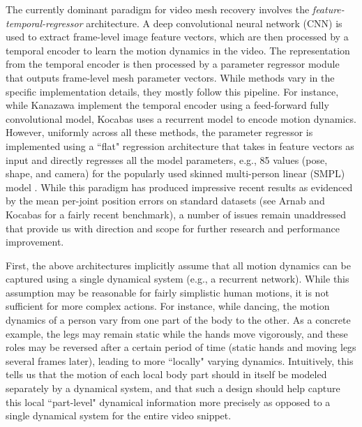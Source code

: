 \documentclass[10pt,twocolumn,letterpaper]{article}
\begin{document}
The currently dominant paradigm for video mesh recovery involves the \textsl{feature-temporal-regressor} architecture. A deep convolutional neural network (CNN) is used to extract frame-level image feature vectors, which are then processed by a temporal encoder to learn the motion dynamics in the video. The representation from the temporal encoder is then processed by a parameter regressor module that outputs frame-level mesh parameter vectors. While methods vary in the specific implementation details, they mostly follow this pipeline. For instance, while Kanazawa \etal \cite{humanMotionKanazawa19} implement the temporal encoder using a feed-forward fully convolutional model, Kocabas \etal \cite{kocabas2019vibe} uses a recurrent model to encode motion dynamics. However, uniformly across all these methods, the parameter regressor is implemented using a ``flat" regression architecture that takes in feature vectors as input and directly regresses all the model parameters, e.g., 85 values (pose, shape, and camera) for the popularly used skinned multi-person linear (SMPL) model \cite{loper2015smpl,hmrKanazawa17}. While this paradigm has produced impressive recent results as evidenced by the mean per-joint position errors on standard datasets (see Arnab \etal \cite{Arnab_2019_CVPR} and Kocabas \etal \cite{kocabas2019vibe} for a fairly recent benchmark), a number of issues remain unaddressed that provide us with direction and scope for further research and performance improvement. 

First, the above architectures implicitly assume that all motion dynamics can be captured using a single dynamical system (e.g., a recurrent network). While this assumption may be reasonable for fairly simplistic human motions, it is not sufficient for more complex actions. For instance, while dancing, the motion dynamics of a person vary from one part of the body to the other. As a concrete example, the legs may remain static while the hands move vigorously, and these roles may be reversed after a certain period of time (static hands and moving legs several frames later), leading to more ``locally" varying dynamics. Intuitively, this tells us that the motion of each local body part should in itself be modeled separately by a dynamical system, and that such a design should help capture this local ``part-level" dynamical information more precisely as opposed to a single dynamical system for the entire video snippet.
\end{document}
